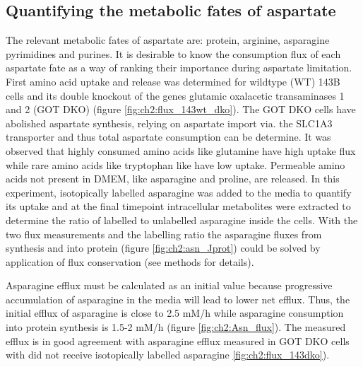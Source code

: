 \subsection{Quantifying the metabolic fates of aspartate}
The relevant metabolic fates of aspartate are: protein, arginine, asparagine pyrimidines and purines.
It is desirable to know the consumption flux of each aspartate fate as a way of ranking their importance during aspartate limitation.
First amino acid uptake and release was determined for wildtype (WT) 143B cells and its double knockout of the genes glutamic oxalacetic transaminases 1 and 2 (GOT DKO) (figure \ref{fig:ch2:flux_143wt_dko}).
The GOT DKO cells have abolished aspartate synthesis, relying on aspartate import via. the SLC1A3 transporter and thus total aspartate consumption can be determine.
It was observed that highly consumed amino acids like glutamine have high uptake flux while rare amino acids like tryptophan like have low uptake.
Permeable amino acids not present in DMEM, like asparagine and proline, are released.
In this experiment, isotopically labelled asparagine was added to the media to quantify its uptake and at the final timepoint intracellular metabolites were extracted to determine the ratio of labelled to unlabelled asparagine inside the cells.
With the two flux measurements and the labelling ratio the asparagine fluxes from synthesis and into protein (figure \ref{fig:ch2:asn_Jprot}) could be solved by application of flux conservation (see methods for details).

Asparagine efflux must be calculated as an initial value because progressive accumulation of asparagine in the media will lead to lower net efflux.
Thus, the initial efflux of asparagine is close to 2.5 mM/h while asparagine consumption into protein synthesis is 1.5-2 mM/h (figure \ref{fig:ch2:Asn_flux}).
The measured efflux is in good agreement with asparagine efflux measured in GOT DKO cells with did not receive isotopically labelled asparagine \ref{fig:ch2:flux_143dko}).

